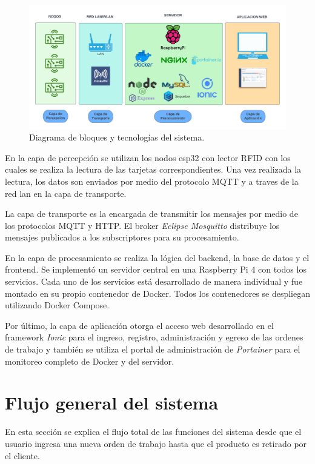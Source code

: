 \begin{figure}[H]
	\centering
	\includegraphics[scale=.25]{./Figures/diagramabloques.png}
	\caption{Diagrama de bloques y tecnologías del sistema.}
	\label{fig:diagramabloques}
\end{figure}


En la capa de percepción se utilizan los nodos esp32 con lector RFID con los cuales se realiza la lectura de las tarjetas correspondientes. Una vez realizada la lectura, los datos son enviados por medio del protocolo MQTT y a traves de la red lan en la capa de transporte. 

La capa de transporte es la encargada de transmitir los mensajes por medio de los protocolos MQTT y HTTP. El broker \textit{Eclipse Mosquitto} distribuye los mensajes publicados a los subscriptores para su procesamiento.

En la capa de procesamiento se realiza la lógica del backend, la base de datos y el frontend. Se implementó un servidor central en una Raspberry Pi 4 con todos los servicios. Cada uno de los servicios está desarrollado de manera individual y fue montado en su propio contenedor de Docker. Todos los contenedores se despliegan utilizando Docker Compose.

Por último, la capa de aplicación otorga el acceso web desarrollado en el framework \textit{Ionic} para el ingreso, registro, administración y egreso de las ordenes de trabajo y también se utiliza el portal de administración de \textit{Portainer} para el monitoreo completo de Docker y del servidor.


\section{Flujo general del sistema}
\label{sec:flujogeneral}
En esta sección se explica el flujo total de las funciones del sistema desde que el usuario ingresa una nueva orden de trabajo hasta que el producto es retirado por el cliente.

